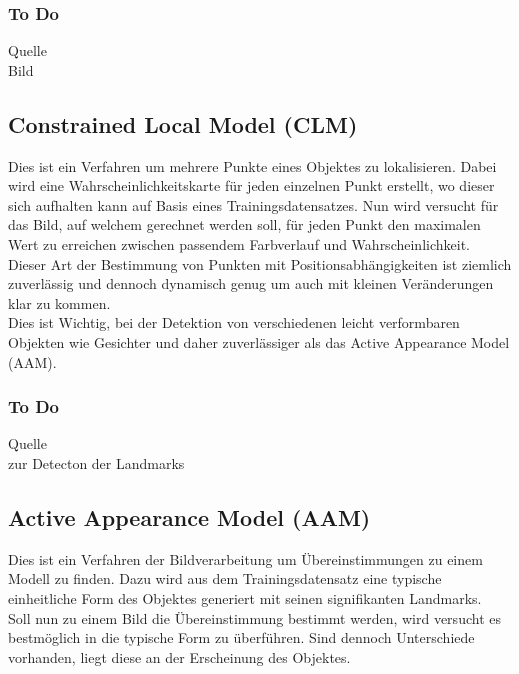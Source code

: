 \subsubsection{To Do}
Quelle\\
Bild
\subsection{Constrained Local Model (CLM)}
Dies ist ein Verfahren um mehrere Punkte eines Objektes zu lokalisieren. Dabei wird eine Wahrscheinlichkeitskarte für jeden einzelnen Punkt erstellt, wo dieser sich aufhalten kann auf Basis eines Trainingsdatensatzes. Nun wird versucht für das Bild, auf welchem gerechnet werden soll, für jeden Punkt den maximalen Wert zu erreichen zwischen passendem Farbverlauf und Wahrscheinlichkeit.\\
Dieser Art der Bestimmung von Punkten mit Positionsabhängigkeiten ist ziemlich zuverlässig und dennoch dynamisch genug um auch mit kleinen Veränderungen klar zu kommen.\\
Dies ist Wichtig, bei der Detektion von verschiedenen leicht verformbaren Objekten wie Gesichter und daher zuverlässiger als das Active Appearance Model (AAM).
\subsubsection{To Do}
Quelle\\
zur Detecton der Landmarks
\subsection{Active Appearance Model (AAM)}
Dies ist ein Verfahren der Bildverarbeitung um Übereinstimmungen zu einem Modell zu finden. Dazu wird aus dem Trainingsdatensatz eine typische einheitliche Form des Objektes generiert mit seinen signifikanten Landmarks.\\
Soll nun zu einem Bild die Übereinstimmung bestimmt werden, wird versucht es bestmöglich in die typische Form zu überführen. Sind dennoch Unterschiede vorhanden, liegt diese an der Erscheinung des Objektes.\\
\cite{wiki_AAM}
